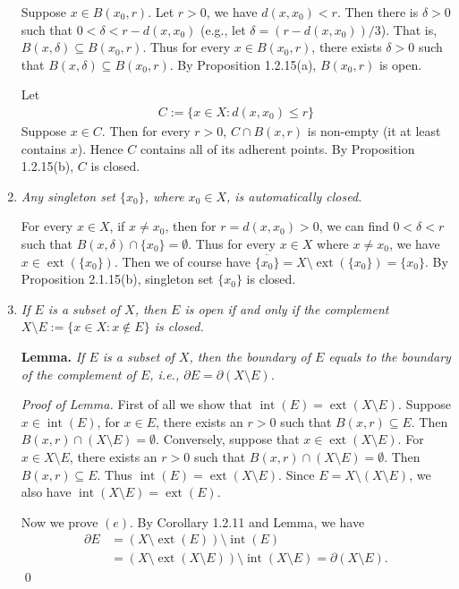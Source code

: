\documentclass{book}
\DeclareMathOperator{\inte}{int}%
\DeclareMathOperator{\ext}{ext}%
\begin{document}
\begin{enumerate}
    Suppose $x\in B(x_0,r)$. Let $r>0$, we have $d(x,x_0)<r$. Then there is $\delta>0$ such that $0<\delta<r-d(x,x_0)$ (e.g., let $\delta=(r-d(x,x_0))/3$). That is, $B(x,\delta)\subseteq B(x_0,r)$. Thus for every $x\in B(x_0,r)$, there exists $\delta>0$ such that $B(x,\delta)\subseteq B(x_0,r)$. By Proposition 1.2.15(a), $B(x_0,r)$ is open.

    Let
        \begin{align*}
            C:=\{x\in X:d(x,x_0)\leq r\}
        \end{align*}
    Suppose $x\in C$. Then for every $r>0$, $C\cap B(x,r)$ is non-empty (it at least contains $x$). Hence $C$ contains all of its adherent points. By Proposition 1.2.15(b), $C$ is closed.

    \item \emph{Any singleton set $\{x_0\}$, where $x_0\in X$, is automatically closed.}
    
    For every $x\in X$, if $x\neq x_0$, then for $r=d(x,x_0)>0$, we can find $0<\delta<r$ such that $B(x,\delta)\cap\{x_0\}=\emptyset$. Thus for every $x\in X$ where $x\neq x_0$, we have $x\in\ext(\{x_0\})$. Then we of course have $\overline{\{x_0\}}=X\setminus\ext(\{x_0\})=\{x_0\}$. By Proposition 2.1.15(b), singleton set $\{x_0\}$ is closed.

    \item \emph{If $E$ is a subset of $X$, then $E$ is open if and only if the complement $X\setminus E:=\{x\in X:x\notin E\}$ is closed.}

    \textbf{Lemma.} \emph{If $E$ is a subset of $X$, then the boundary of $E$ equals to the boundary of the complement of $E$, i.e., $\partial E=\partial(X\setminus E)$.}

    \emph{Proof of Lemma.} First of all we show that $\inte(E)=\ext(X\setminus E)$. Suppose $x\in\inte(E)$, for $x\in E$, there exists an $r>0$ such that $B(x,r)\subseteq E$. Then $B(x,r)\cap(X\setminus E)=\emptyset$. Conversely, suppose that $x\in\ext(X\setminus E)$. For $x\in X\setminus E$, there exists an $r>0$ such that $B(x,r)\cap(X\setminus E)=\emptyset$. Then $B(x,r)\subseteq E$. Thus $\inte(E)=\ext(X\setminus E)$. Since $E=X\setminus(X\setminus E)$, we also have $\inte(X\setminus E)=\ext(E)$.

    Now we prove $(e)$. By Corollary 1.2.11 and Lemma, we have
        \begin{align*}
            \partial E&=(X\setminus\ext(E))\setminus\inte(E)\\
            &=(X\setminus\ext(X\setminus E))\setminus\inte(X\setminus E)=\partial(X\setminus E).
        \end{align*}\qed


\end{enumerate}
\end{document}
